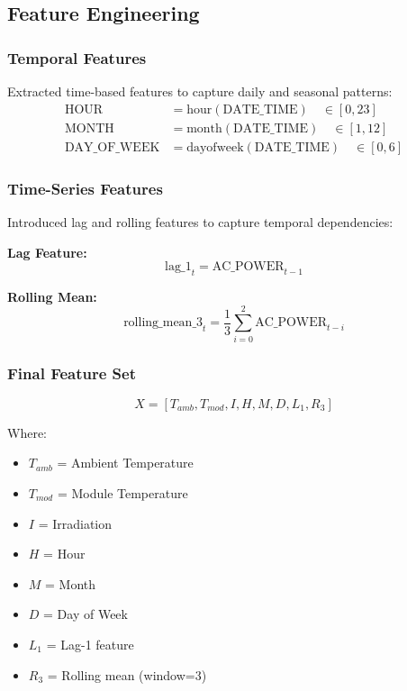 \documentclass[12pt,a4paper]{article}
\begin{document}
\subsection{Feature Engineering}

\subsubsection{Temporal Features}
Extracted time-based features to capture daily and seasonal patterns:
\begin{align}
\text{HOUR} &= \text{hour}(\text{DATE\_TIME}) \quad \in [0, 23] \\
\text{MONTH} &= \text{month}(\text{DATE\_TIME}) \quad \in [1, 12] \\
\text{DAY\_OF\_WEEK} &= \text{dayofweek}(\text{DATE\_TIME}) \quad \in [0, 6]
\end{align}

\subsubsection{Time-Series Features}
Introduced lag and rolling features to capture temporal dependencies:

\textbf{Lag Feature:}
\begin{equation}
\text{lag\_1}_t = \text{AC\_POWER}_{t-1}
\end{equation}

\textbf{Rolling Mean:}
\begin{equation}
\text{rolling\_mean\_3}_t = \frac{1}{3}\sum_{i=0}^{2} \text{AC\_POWER}_{t-i}
\end{equation}

\subsubsection{Final Feature Set}
\begin{equation}
X = [T_{amb}, T_{mod}, I, H, M, D, L_1, R_3]
\end{equation}

Where:
\begin{itemize}
    \item $T_{amb}$ = Ambient Temperature
    \item $T_{mod}$ = Module Temperature
    \item $I$ = Irradiation
    \item $H$ = Hour
    \item $M$ = Month
    \item $D$ = Day of Week
    \item $L_1$ = Lag-1 feature
    \item $R_3$ = Rolling mean (window=3)
\end{itemize}
\end{document}
